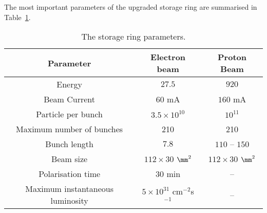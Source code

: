  The most important parameters of the upgraded \hera storage ring are summarised in Table~\ref{tab:HERAParameters}.
\begin{table}[htbp]
	\centering
		\begin{tabular}[h]{|c|c|c|}
			\hline
			Parameter       & Electron beam   & Proton Beam \\
			\hline \hline
			Energy            &     $27.5$ \GeV  & $920$ \GeV \\
			Beam Current  &     $60$ mA       & $160$ mA \\
			Particle per bunch & $3.5\times 10^{10}$ & $10^{11}$ \\
			Maximum number of bunches & 210 & 210 \\
			Bunch length &  $7.8$ \mm & $110$ -- $150$ \mm \\
			Beam size     &  $112\times 30$ $\mm^2$ & $112\times 30$ $\mm^2$ \\
			Polarisation time & $30$ min & -- \\
			Maximum instantaneous luminosity & $5\times 10^{31}$ cm$^{-2}$s$^{-1}$ & -- \\
			\hline
		\end{tabular}
	\caption{The \hera storage ring parameters.}
	\label{tab:HERAParameters}
\end{table}


